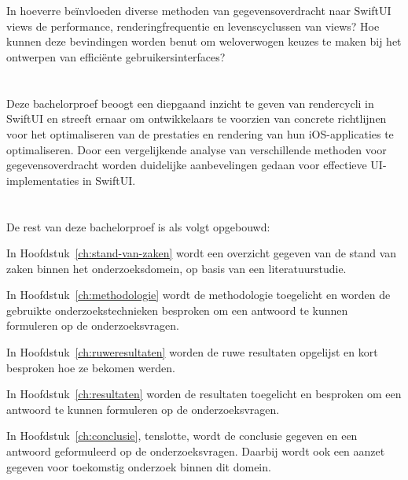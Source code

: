\section{}%
\label{sec:onderzoeksvraag}
In hoeverre beïnvloeden diverse methoden van
gegevensoverdracht naar SwiftUI views de performance,
renderingfrequentie en levenscyclussen
van views? Hoe kunnen deze bevindingen
worden benut om weloverwogen keuzes te maken
bij het ontwerpen van efficiënte gebruikersinterfaces?

\section{}%
\label{sec:onderzoeksdoelstelling}


Deze bachelorproef beoogt een diepgaand inzicht te geven
van rendercycli in SwiftUI en streeft ernaar
om ontwikkelaars te voorzien van concrete
richtlijnen voor het optimaliseren van de prestaties
en rendering van hun iOS-applicaties te optimaliseren. Door
een vergelijkende analyse van verschillende
methoden voor gegevensoverdracht worden duidelijke aanbevelingen gedaan voor effectieve UI-implementaties
in SwiftUI.
\section{}%
\label{sec:opzet-bachelorproef}


De rest van deze bachelorproef is als volgt opgebouwd:

In Hoofdstuk~\ref{ch:stand-van-zaken} wordt een overzicht gegeven van de stand van zaken binnen het onderzoeksdomein, op basis van een literatuurstudie.

In Hoofdstuk~\ref{ch:methodologie} wordt de methodologie toegelicht en worden de gebruikte onderzoekstechnieken besproken om een antwoord te kunnen formuleren op de onderzoeksvragen.

In Hoofdstuk~\ref{ch:ruweresultaten} worden de ruwe resultaten opgelijst en kort besproken hoe ze bekomen werden.

In Hoofdstuk~\ref{ch:resultaten} worden de resultaten toegelicht en besproken om een antwoord te kunnen formuleren op de onderzoeksvragen.

In Hoofdstuk~\ref{ch:conclusie}, tenslotte, wordt de conclusie gegeven en een antwoord geformuleerd op de onderzoeksvragen. Daarbij wordt ook een aanzet gegeven voor toekomstig onderzoek binnen dit domein.